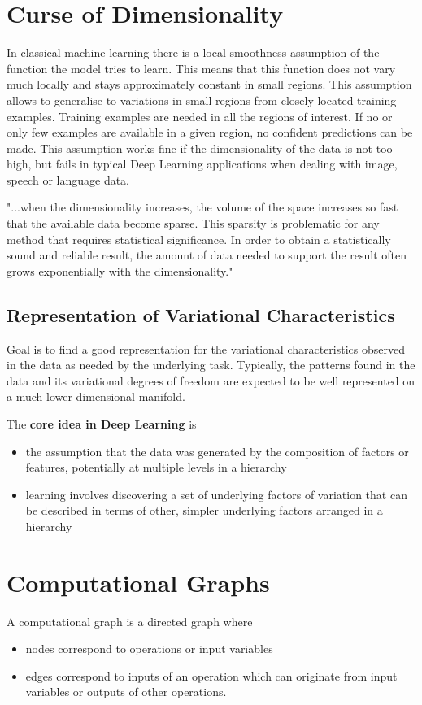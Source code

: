 \documentclass[11pt]{article}
\begin{document}
\section{Curse of Dimensionality}

In classical machine learning there is a local smoothness assumption of the function the model tries to learn. This means that this function does not vary much locally and stays approximately constant in small regions. This assumption allows to generalise to variations in small regions from closely located training examples. Training examples are needed in all the regions of interest. If no or only few examples are available in a given region, no confident predictions can be made. This assumption works fine if the dimensionality of the data is not too high, but fails in typical Deep Learning applications when dealing with image, speech or language data.

"...when the dimensionality increases, the volume of the space increases so fast that the available data become sparse. This sparsity is problematic for any method that requires statistical significance. In order to obtain a statistically sound and reliable result, the amount of data needed to support the result often grows exponentially with the dimensionality."

\subsection{Representation of Variational Characteristics}
Goal is to find a good representation for the variational characteristics observed in the data as needed by the underlying task. Typically, the patterns found in the data and its variational degrees of freedom are expected to be well represented on a much lower dimensional manifold.

\begin{theorem}
	The \textbf{core idea in Deep Learning} is
	\begin{itemize}
		\item the assumption that the data was generated by the composition of factors or features, potentially at multiple levels in a hierarchy
		\item learning involves discovering a set of underlying factors of variation that can be described in terms of other, simpler underlying factors arranged in a hierarchy
	\end{itemize}
\end{theorem}

\section{Computational Graphs}
A computational graph is a directed graph where
\begin{itemize}
	\item nodes correspond to operations or input variables
	\item edges correspond to inputs of an operation which can originate from input variables or outputs of other operations.
\end{itemize}
\end{document}
